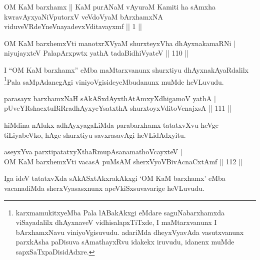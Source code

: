 \begin{kandikeshl}
OM KaM barxhamx || KaM purANaM vAyuraM Kamiti ha sAmxha kwravAyxyaNiVputorxV veVdoV\s yaM bArxhamxNA viduveVRdeYneVna\break yadevxVditavayxmf || 1 ||
\end{kandikeshl}

\centerline{}


\begin{shl}
OM KaM barxhemxVti manotxrXV\s yaM shurxteyxVha dhAyxnakamaRNi  | \\
niyujayxteV PalapArxpwtx yathA tadaBidhiVyateV \hfill||  110 ||  
\end{shl}

\begin{artha}
I ``OM KaM barxhamx'' eMba maMtarxvanunx shurxtiyu dhAyxnakAyaRdalilx \footnote{karxmamukitxyeMba Pala lABakAkxgi eMdare saguNabarxhamxda viSayadalilx dhAyxnaveV vidhisalapxTiTxde, I maMtarxvanunx I bArxhamxNavu viniyoVgisuvudu. adariMda dheyxVyavAda vasutxvanunx parxkAsha paDisuva sAmathayxRvu idakekx iruvudu, idanenx muMde sapxSaTxpaDisidAdxre.}Pala saMpAdanegAgi viniyoVgisideyeMbudanunx muMde heVLuvudu.
\end{artha}


\begin{shl}
parasayx barxhamxNaH sAkASxdAyxthAtAmxyXdhigamoV yathA  | \\
pUveYRshacxtuBiRradhAyxyeYsatxthA shurxtoyxVditoV\s cnajxsA \hfill||  111 ||  
\end{shl}

\begin{artha}
hiMdina nAlukx adhAyxyagaLiMda parabarxhamx tatatxvXvu heVge tiLiyabeVko, hAge shurxtiyu savxrasavAgi heVLidAdxyitu.
\end{artha}

\begin{shl}
aseyxYva parxtipatatxyXthaRmupAsanamathoVcayxteV  | \\
OM KaM barxhemxVti vacasA puMsAM sherxVyoVBivAcnaCxtAmf \hfill||  112 ||  
\end{shl}

\begin{artha}
Iga ideV tatatxvXda sAkASxtAkxrakAkxgi `OM KaM barxhamx' eMba vacanadiMda sherxVyasasxnunx apeVkiSxsuvavarige heVLuvudu.
\end{artha}

